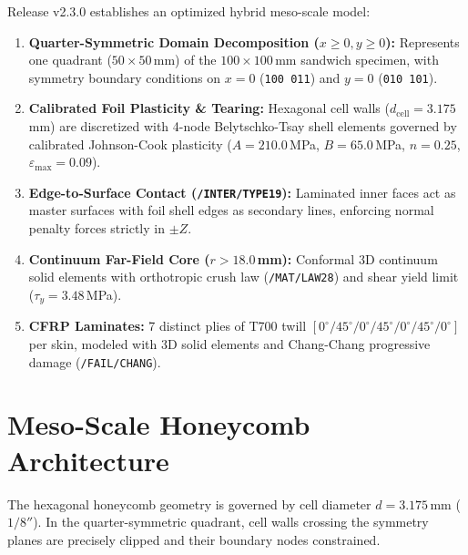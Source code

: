 \documentclass[11pt,a4paper]{article}
\begin{document}
Release v2.3.0 establishes an optimized hybrid meso-scale model:
\begin{enumerate}
    \item \textbf{Quarter-Symmetric Domain Decomposition ($x \ge 0, y \ge 0$):} Represents one quadrant ($50 \times 50$\,mm) of the $100 \times 100$\,mm sandwich specimen, with symmetry boundary conditions on $x = 0$ (\texttt{100 011}) and $y = 0$ (\texttt{010 101}).
    \item \textbf{Calibrated Foil Plasticity \& Tearing:} Hexagonal cell walls ($d_{\text{cell}} = 3.175$\,mm) are discretized with 4-node Belytschko-Tsay shell elements governed by calibrated Johnson-Cook plasticity ($A = 210.0$\,MPa, $B = 65.0$\,MPa, $n = 0.25$, $\varepsilon_{\text{max}} = 0.09$).
    \item \textbf{Edge-to-Surface Contact (\texttt{/INTER/TYPE19}):} Laminated inner faces act as master surfaces with foil shell edges as secondary lines, enforcing normal penalty forces strictly in $\pm Z$.
    \item \textbf{Continuum Far-Field Core ($r > 18.0$\,mm):} Conformal 3D continuum solid elements with orthotropic crush law (\texttt{/MAT/LAW28}) and shear yield limit ($\tau_y = 3.48$\,MPa).
    \item \textbf{CFRP Laminates:} 7 distinct plies of T700 twill $[0^\circ/45^\circ/0^\circ/45^\circ/0^\circ/45^\circ/0^\circ]$ per skin, modeled with 3D solid elements and Chang-Chang progressive damage (\texttt{/FAIL/CHANG}).
\end{enumerate}

\section{Meso-Scale Honeycomb Architecture}
The hexagonal honeycomb geometry is governed by cell diameter $d = 3.175$\,mm ($1/8''$). In the quarter-symmetric quadrant, cell walls crossing the symmetry planes are precisely clipped and their boundary nodes constrained.
\end{document}
